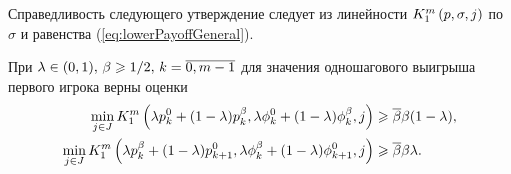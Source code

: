 Справедливость следующего утверждение следует из линейности
$K_{1}^m\left({p}, {\sigma}, {j}\right)$ по $\sigma$ и равенства
(\ref{eq:lowerPayoffGeneral}).

\begin{proposition}
  \label{proposition:first:combination:step}
  При $\lambda \in (0, 1), \, \beta \geqslant 1/2, \, k = \overline{0, m-1}$ для
  значения одношагового выигрыша первого игрока верны оценки
  \begin{align*}
    \min_{j \in J}
    \firstPlayerPayoff{1}{%
    \lambda \pEven + (1-\lambda) \pOdd}{%
    \lambda \fEven + (1-\lambda) \fOdd}{%
    j}
    &\geq \DCo \Co (1-\lambda), \\
    \min_{j \in J}
    \firstPlayerPayoff{1}{%
    \lambda \pOdd + (1-\lambda) \pEven[k+1]}{%
    \lambda \fOdd + (1-\lambda) \fEven[k+1]}{%
    j}
    &\geq \DCo \Co \lambda.
  \end{align*}
\end{proposition}

